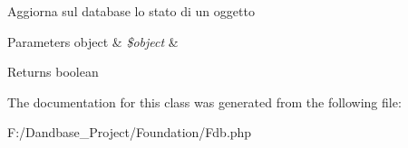 Aggiorna sul database lo stato di un oggetto


\begin{DoxyParams}[1]{Parameters}
object & {\em \$object} & \\
\hline
\end{DoxyParams}
\begin{DoxyReturn}{Returns}
boolean 
\end{DoxyReturn}


The documentation for this class was generated from the following file\+:\begin{DoxyCompactItemize}
\item 
F\+:/\+Dandbase\+\_\+\+Project/\+Foundation/Fdb.\+php\end{DoxyCompactItemize}
